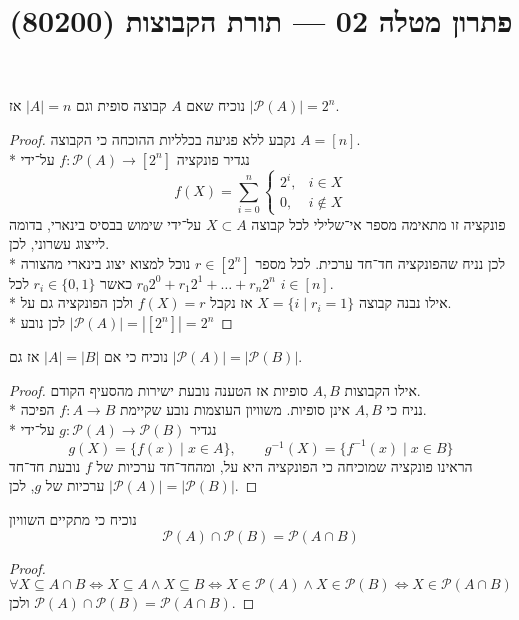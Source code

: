 
\title{פתרון מטלה 02 --- תורת הקבוצות (80200)}


\maketitle
\maketitleprint{}

\Question{}
\Subquestion{}
נוכיח שאם $A$ קבוצה סופית וגם $|A| = n$ אז $|\mathcal{P}(A)| = 2^n$.
\begin{proof}
	נקבע ללא פגיעה בכלליות ההוכחה כי הקבוצה $A = [n]$. \\*
	נגדיר פונקציה $f : \mathcal{P}(A) \to [2^n]$ על־ידי
	\[
		f(X) = \sum_{i = 0}^{n} \begin{cases}
			2^i, & i \in X \\
			0, & i \not\in X
		\end{cases}
	\]
	פונקציה זו מתאימה מספר אי־שלילי לכל קבוצה $X \subset A$ על־ידי שימוש בבסיס בינארי, בדומה לייצוג עשרוני, לכן. \\*
	לכן נניח שהפונקציה חד־חד ערכית. לכל מספר $r \in [2^n]$ נוכל למצוא יצוג בינארי מהצורה $r_0 2^0 + r_1 2^1 + \hdots + r_n 2^n$ כאשר $r_i \in \{0, 1\}$ לכל $i \in [n]$. \\*
	אילו נבנה קבוצה $X = \{i \mid r_i = 1\}$ אז נקבל $f(X) = r$ ולכן הפונקציה גם על. \\*
	לכן נובע $|\mathcal{P}(A)| = |[2^n]| = 2^n$
\end{proof}

\Subquestion{}
נוכיח כי אם $|A| = |B|$ אז גם $|\mathcal{P}(A)| = |\mathcal{P}(B)|$.
\begin{proof}
	אילו הקבוצות $A, B$ סופיות אז הטענה נובעת ישירות מהסעיף הקודם. \\*
	נניח כי $A, B$ אינן סופיות. משוויון העוצמות נובע שקיימת $f : A \to B$ הפיכה. \\*
	נגדיר $g : \mathcal{P}(A) \to \mathcal{P}(B)$ על־ידי
	\[
		g(X) = \{ f(x) \mid x \in A \}, \qquad
		g^{-1}(X) = \{ f^{-1}(x) \mid x \in B \}
	\]
	הראינו פונקציה שמוכיחה כי הפונקציה היא על, ומהחד־חד ערכיות של $f$ נובעת חד־חד ערכיות של $g$, לכן $|\mathcal{P}(A)| = |\mathcal{P}(B)|$.
\end{proof}

\Subquestion{}
נוכיח כי מתקיים השוויון
\[
	\mathcal{P}(A) \cap \mathcal{P}(B) = \mathcal{P}(A \cap B)
\]
\begin{proof}
	\[
		\forall X \subseteq A \cap B
		\iff X \subseteq A \land X \subseteq B
		\iff X \in \mathcal{P}(A) \land X \in \mathcal{P}(B)
		\iff X \in \mathcal{P}(A \cap B)
	\]
	ולכן $\mathcal{P}(A) \cap \mathcal{P}(B) = \mathcal{P}(A \cap B)$.
\end{proof}

